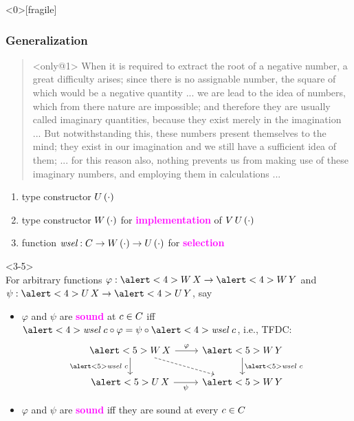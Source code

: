 \documentclass[draft,notes=show,xcolor=dvipsnames]{beamer}
\newcommand*{\vocab}[1]{\textbf{\textcolor{magenta}{#1}}}
\begin{document}
\begin{frame}<0>[fragile]
  \frametitle{Generalization}
  \begin{quote}<only@1>
    When it is required to extract the root of a negative number, a great difficulty arises; since there is no assignable number, the square of which would be a negative quantity
    ...
    we are lead to the idea of numbers, which from there nature are impossible; and therefore they are usually called imaginary quantities, because they exist merely in the imagination ...
    But notwithstanding this, these numbers present themselves to the mind; they exist in our imagination and we still have a sufficient idea of them; ...
    for this reason also, nothing prevents us from making use of these imaginary numbers, and employing them in calculations ...
  \end{quote}
  \begin{enumerate}[<only@2>]
    \item type constructor $\TConsU[(\cdot)]$
    \item type constructor $\TConsW[(\cdot)]$ for \vocab{implementation} of $\Var[]\TConsU[(\cdot)]$
    \item function $\wsel : \cS \to \TConsW \to \TConsU$ for \vocab{selection}
  \end{enumerate}
  \begin{onlyenv}<3-5>
    \setlength{\abovedisplayskip}{0pt}%
    \setlength{\belowdisplayskip}{0pt}%
    \\
    For arbitrary functions $\varphi : \alert<4>{\TConsW[]}\Val \to \alert<4>{\TConsW[]}\ValY$ and $\psi : \alert<4>{\TConsU[]}\Val \to \alert<4>{\TConsU[]}\ValY$, say
    \begin{itemize}
      \item $\varphi$ and $\psi$ are \vocab{sound} at $\cE \in \cS$ iff $\alert<4>{\wsel}\ \cE \comp \varphi = \psi \comp \alert<4>{\wsel}\ \cE$, i.e., TFDC:
      $$
        \begin{tikzcd}
          \alert<5>{\TConsW[]}\Val \ar[d, "\alert<5>{\wsel}\ \cE"'] \ar[r, "\varphi"] \ar[dr, dashed] &
          \alert<5>{\TConsW[]}\ValY \ar[d, "\alert<5>{\wsel}\ \cE"] \\
          \alert<5>{\TConsU[]}\Val \ar[r, "\psi"'] & \alert<5>{\TConsW[]}\ValY
        \end{tikzcd}
      $$
      \item $\varphi$ and $\psi$ are \vocab{sound} iff they are sound at every $\cE \in \cS$
    \end{itemize}
  \end{onlyenv}
\end{frame}
\end{document}
